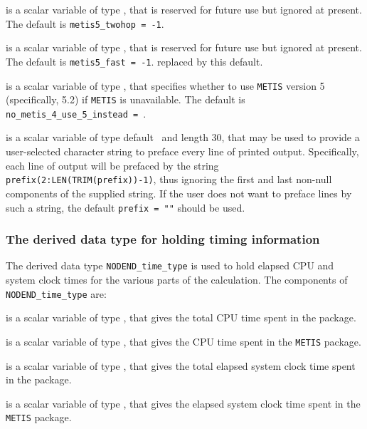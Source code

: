 \documentclass{galahad}
\newcommand{\packagename}{NODEND}
\begin{document}
\begin{description}
 is a scalar variable of type \integer, 
that is reserved for future use but ignored at present.
The default is {\tt metis5\_twohop = -1}.

 is a scalar variable of type \integer, 
that is reserved for future use but ignored at present.
The default is {\tt metis5\_fast = -1}.
replaced by this default.

 is a scalar variable of type \logical, 
that specifies whether to use {\tt METIS} version 5 (specifically, 5.2) 
if {\tt METIS} is unavailable.
The default is {\tt no\_metis\_4\_use\_5\_instead = \true}.

 is a scalar variable of type default \character\
and length 30, that may be used to provide a user-selected
character string to preface every line of printed output.
Specifically, each line of output will be prefaced by the string
{\tt prefix(2:LEN(TRIM(prefix))-1)},
thus ignoring the first and last non-null components of the
supplied string. If the user does not want to preface lines by such
a string, the default {\tt prefix = ""} should be used.

\end{description}


\subsubsection{The derived data type for holding timing
 information}\label{typetime}
The derived data type
{\tt \packagename\_time\_type}
is used to hold elapsed CPU and system clock times for the various parts of
the calculation. The components of
{\tt \packagename\_time\_type}
are:
\begin{description}
 is a scalar variable of type \realdp, that gives
 the total CPU time spent in the package.

 is a scalar variable of type \realdp, that gives
 the CPU time spent in the {\tt METIS} package.

 is a scalar variable of type \realdp, that gives
 the total elapsed system clock time spent in the package.

 is a scalar variable of type \realdp, that gives
 the elapsed system clock time spent in the {\tt METIS} package.

\end{description}
\end{document}
